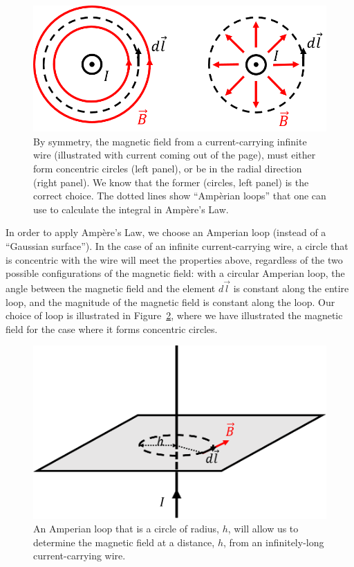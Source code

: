 \begin{figure}[!htbp]
\centering
\includegraphics[width=0.6\linewidth]{files/amperewire-472189ba3763707d7ea318766a8855fb.png}
\caption[]{By symmetry, the magnetic field from a current-carrying infinite wire (illustrated with current coming out of the page), must either form concentric circles (left panel), or be in the radial direction (right panel). We know that the former (circles, left panel) is the correct choice. The dotted lines show ``Ampèrian loops'' that one can use to calculate the integral in Ampère's Law.}
\label{fig:magneticsource:amperewire}
\end{figure}

In order to apply Ampère's Law, we choose an Amperian loop (instead of a ``Gaussian surface''). In the case of an infinite current-carrying wire, a circle that is concentric with the wire will meet the properties above, regardless of the two possible configurations of the magnetic field: with a circular Amperian loop, the angle between the magnetic field and the element $d\vec l$ is constant along the entire loop, and the magnitude of the magnetic field is constant along the loop. Our choice of loop is illustrated in Figure~\ref{fig:magneticsource:amperewireloop}, where we have illustrated the magnetic field for the case where it forms concentric circles.

\begin{figure}[!htbp]
\centering
\includegraphics[width=0.5\linewidth]{files/amperewireloop-b47f54367ef17bf0efcd9e449152a81b.png}
\caption[]{An Amperian loop that is a circle of radius, $h$, will allow us to determine the magnetic field at a distance, $h$, from an infinitely-long current-carrying wire.}
\label{fig:magneticsource:amperewireloop}
\end{figure}

